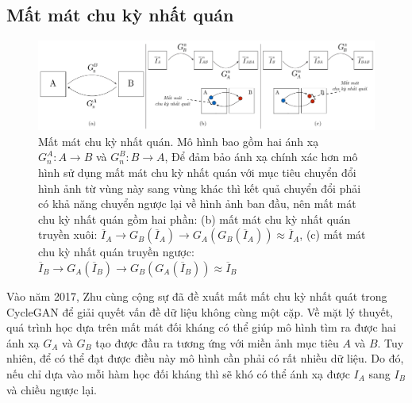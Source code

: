 \documentclass[12pt]{report}%
\begin{document}
\subsection{Mất mát chu kỳ nhất quán} 
\begin{figure}[t]
\vspace{-0.5cm}
	\centering
	\includegraphics[width=1\textwidth]{img/Cycle-loss.pdf}
	\caption[Mất mát chu kỳ nhất quán]{\blindtext Mất mát chu kỳ nhất quán. \quad Mô hình bao gồm hai ánh xạ $G_n ^A: A \rightarrow B$ và $G_n ^B: B \rightarrow A$, Để đảm bảo ánh xạ chính xác hơn mô hình sử dụng mất mát chu kỳ nhất quán với mục tiêu chuyển đổi hình ảnh từ vùng này sang vùng khác thì kết quả chuyển đổi  phải có khả năng chuyển ngược lại về hình ảnh ban đầu, nên  mất mát chu kỳ nhất quán gồm hai phần: (b) mất mát chu kỳ nhất quán truyền xuôi: $\overline{I}_A \to G_B\left( \overline{I}_A \right) \to G_A\left( {G_B\left( \overline{I}_A \right)} \right) \approx \overline{I}_A$, (c) mất mát chu kỳ nhất quán truyền ngược: $\overline{I}_B \to G_A\left( \overline{I}_B \right) \to G_B\left( {G_A\left( \overline{I}_B \right)} \right) \approx \overline{I}_B$}
	\label{fig:cycle-loss} \vspace{-0.4cm}
\end{figure}
Vào năm 2017, Zhu cùng cộng sự \cite{zhu2017unpaired} đã đề xuất mất mất chu kỳ nhất quát trong CycleGAN  để giải quyết vấn đề dữ liệu không cùng một cặp. Về mặt lý thuyết, quá trình học dựa trên mất mát đối kháng có thể giúp mô hình tìm ra được hai ánh xạ $G_A$ và $G_B$  tạo được đầu ra tương ứng với miền ảnh mục tiêu $A$ và $B$. Tuy nhiên, để có thể đạt được điều này mô hình cần phải có rất nhiều dữ liệu. Do đó, nếu chỉ dựa vào mỗi hàm học đối kháng thì sẽ khó có thể ánh xạ được $I_A$ sang $I_B$ và chiều ngược lại. 
\end{document}
